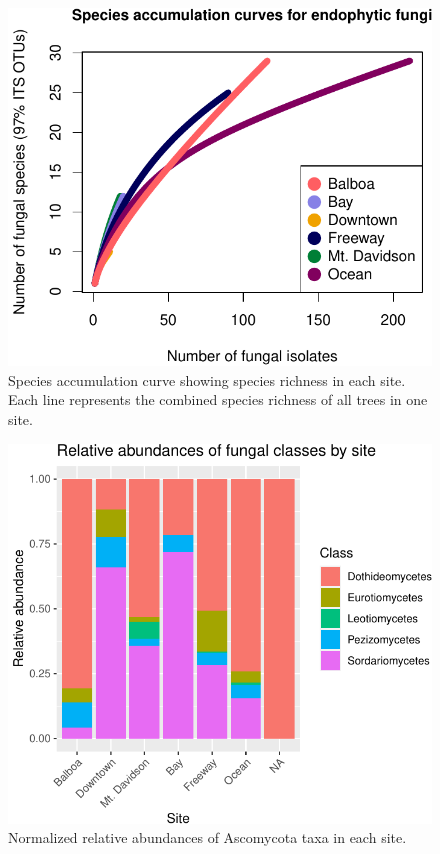 \documentclass[fleqn,10pt,lineno]{wlpeerj} %
\begin{document}
\begin{figure}
\centering
\includegraphics{gibson2021_files/figure-latex/rarefaction-1.pdf}
\caption{\label{fig:rarefaction}Species accumulation curve showing species richness in each site. Each line represents the combined species richness of all trees in one site.}
\end{figure}

\begin{figure}
\centering
\includegraphics{gibson2021_files/figure-latex/bar-graph-1.pdf}
\caption{\label{fig:bar-graph}Normalized relative abundances of Ascomycota taxa in each site.}
\end{figure}
\end{document}
